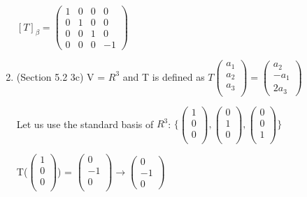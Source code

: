 \documentclass[12pt]{article}
\begin{document}
\begin{enumerate}
    $[T]_\beta = \begin{pmatrix}
        1 & 0 & 0 & 0 \\
        0 & 1 & 0 & 0 \\
        0 & 0 & 1 & 0 \\
        0 & 0 & 0 & -1 
    \end{pmatrix}$

    \item (Section 5.2 3c)
    V = $R^3$ and T is defined as $T\begin{pmatrix}
        a_1 \\
        a_2 \\
        a_3 \\
    \end{pmatrix} = \begin{pmatrix}
        a_2 \\
        -a_1 \\
        2a_3
    \end{pmatrix}$

    Let us use the standard basis of $R^3$: $\{\begin{pmatrix}
        1 \\
        0 \\
        0 \\
    \end{pmatrix}, \begin{pmatrix}
        0 \\
        1 \\
        0 \\
    \end{pmatrix}, \begin{pmatrix}
        0 \\
        0 \\
        1 \\
    \end{pmatrix} \}$

    T($\begin{pmatrix}
        1 \\
        0 \\
        0 \\
    \end{pmatrix}$) = $\begin{pmatrix}
        0 \\
        -1 \\
        0 \\
    \end{pmatrix} \rightarrow \begin{pmatrix}
        0 \\
        -1 \\
        0
    \end{pmatrix}$


\end{enumerate}
\end{document}
